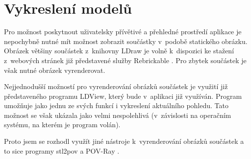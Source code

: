 \section{Vykreslení modelů}\label{reserse-vykresleni}
Pro možnost poskytnout uživatelsky přívětivé a přehledné prostředí aplikace je nepochybně nutné mít možnost zobrazit součástky v~podobě statického obrázku. Obrázek většiny součástek z~knihovny LDraw je volně k~dispozici ke stažení z~webových stránek již představené služby Rebrickable \autocite{rebrickable:download}. Pro zbytek součástek je však nutné obrázek vyrenderovat. 

Nejjednodušší možností pro vyrenderování obrázků součástek je využití již představeného programu LDView, který bude v~aplikaci již využíván. Program umožňuje jako jednu ze svých funkcí i vykreslení aktuálního pohledu. Tato možnost se však ukázala jako velmi nespolehlivá (v~závislosti na operačním systému, na kterém je program volán).

Proto jsem se rozhodl využít jiné nástroje k~vyrenderování obrázků součástek a to sice programy stl2pov \autocite{stl2pov} a POV-Ray \autocite{povray}.

